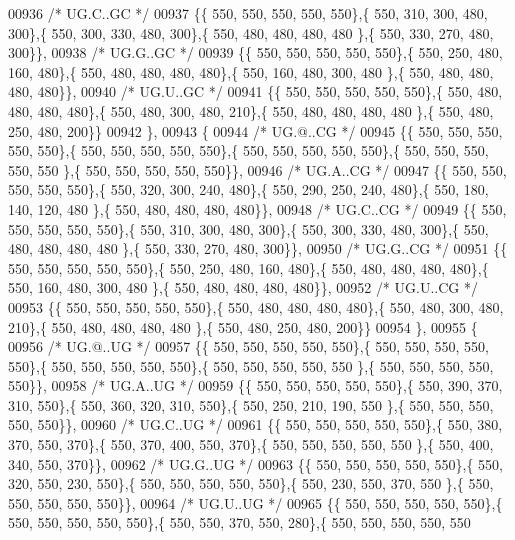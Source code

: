 \begin{DoxyCode}
00936 \textcolor{comment}{/* UG.C..GC */}
00937 \{\{ 550, 550, 550, 550, 550\},\{ 550, 310, 300, 480, 300\},\{ 550, 300, 330, 480, 300\},\{ 550, 480, 480, 480, 480
      \},\{ 550, 330, 270, 480, 300\}\},
00938 \textcolor{comment}{/* UG.G..GC */}
00939 \{\{ 550, 550, 550, 550, 550\},\{ 550, 250, 480, 160, 480\},\{ 550, 480, 480, 480, 480\},\{ 550, 160, 480, 300, 480
      \},\{ 550, 480, 480, 480, 480\}\},
00940 \textcolor{comment}{/* UG.U..GC */}
00941 \{\{ 550, 550, 550, 550, 550\},\{ 550, 480, 480, 480, 480\},\{ 550, 480, 300, 480, 210\},\{ 550, 480, 480, 480, 480
      \},\{ 550, 480, 250, 480, 200\}\}
00942 \},
00943 \{
00944 \textcolor{comment}{/* UG.@..CG */}
00945 \{\{ 550, 550, 550, 550, 550\},\{ 550, 550, 550, 550, 550\},\{ 550, 550, 550, 550, 550\},\{ 550, 550, 550, 550, 550
      \},\{ 550, 550, 550, 550, 550\}\},
00946 \textcolor{comment}{/* UG.A..CG */}
00947 \{\{ 550, 550, 550, 550, 550\},\{ 550, 320, 300, 240, 480\},\{ 550, 290, 250, 240, 480\},\{ 550, 180, 140, 120, 480
      \},\{ 550, 480, 480, 480, 480\}\},
00948 \textcolor{comment}{/* UG.C..CG */}
00949 \{\{ 550, 550, 550, 550, 550\},\{ 550, 310, 300, 480, 300\},\{ 550, 300, 330, 480, 300\},\{ 550, 480, 480, 480, 480
      \},\{ 550, 330, 270, 480, 300\}\},
00950 \textcolor{comment}{/* UG.G..CG */}
00951 \{\{ 550, 550, 550, 550, 550\},\{ 550, 250, 480, 160, 480\},\{ 550, 480, 480, 480, 480\},\{ 550, 160, 480, 300, 480
      \},\{ 550, 480, 480, 480, 480\}\},
00952 \textcolor{comment}{/* UG.U..CG */}
00953 \{\{ 550, 550, 550, 550, 550\},\{ 550, 480, 480, 480, 480\},\{ 550, 480, 300, 480, 210\},\{ 550, 480, 480, 480, 480
      \},\{ 550, 480, 250, 480, 200\}\}
00954 \},
00955 \{
00956 \textcolor{comment}{/* UG.@..UG */}
00957 \{\{ 550, 550, 550, 550, 550\},\{ 550, 550, 550, 550, 550\},\{ 550, 550, 550, 550, 550\},\{ 550, 550, 550, 550, 550
      \},\{ 550, 550, 550, 550, 550\}\},
00958 \textcolor{comment}{/* UG.A..UG */}
00959 \{\{ 550, 550, 550, 550, 550\},\{ 550, 390, 370, 310, 550\},\{ 550, 360, 320, 310, 550\},\{ 550, 250, 210, 190, 550
      \},\{ 550, 550, 550, 550, 550\}\},
00960 \textcolor{comment}{/* UG.C..UG */}
00961 \{\{ 550, 550, 550, 550, 550\},\{ 550, 380, 370, 550, 370\},\{ 550, 370, 400, 550, 370\},\{ 550, 550, 550, 550, 550
      \},\{ 550, 400, 340, 550, 370\}\},
00962 \textcolor{comment}{/* UG.G..UG */}
00963 \{\{ 550, 550, 550, 550, 550\},\{ 550, 320, 550, 230, 550\},\{ 550, 550, 550, 550, 550\},\{ 550, 230, 550, 370, 550
      \},\{ 550, 550, 550, 550, 550\}\},
00964 \textcolor{comment}{/* UG.U..UG */}
00965 \{\{ 550, 550, 550, 550, 550\},\{ 550, 550, 550, 550, 550\},\{ 550, 550, 370, 550, 280\},\{ 550, 550, 550, 550, 550

\end{DoxyCode}
